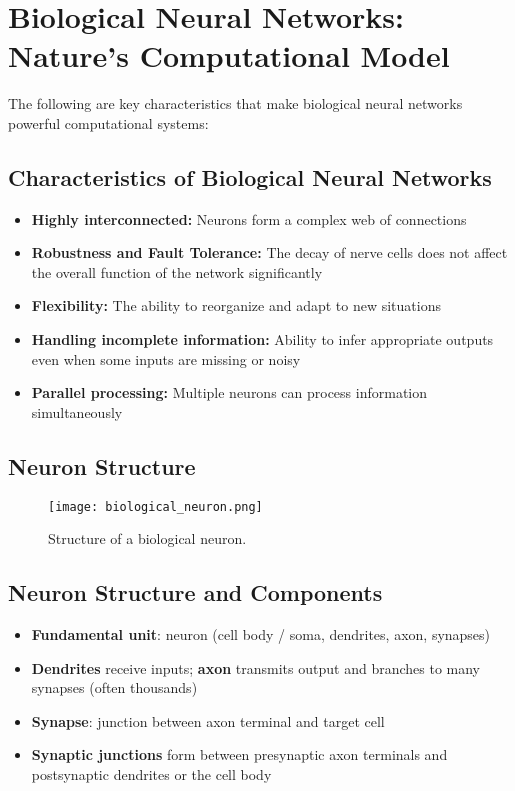 \section{Biological Neural Networks: Nature's Computational Model}
The following are key characteristics that make biological neural networks powerful computational systems:

\subsection{Characteristics of Biological Neural Networks}
\begin{itemize}
    \item \textbf{Highly interconnected:} Neurons form a complex web of connections
    \item \textbf{Robustness and Fault Tolerance:} The decay of nerve cells does not affect the overall function of the network significantly
    \item \textbf{Flexibility:} The ability to reorganize and adapt to new situations
    \item \textbf{Handling incomplete information:} Ability to infer appropriate outputs even when some inputs are missing or noisy
    \item \textbf{Parallel processing:} Multiple neurons can process information simultaneously
\end{itemize}
\subsection{Neuron Structure}
\begin{figure}[h!]
\centering
\texttt{[image: biological\_neuron.png]}
\caption{Structure of a biological neuron.}
\end{figure}
\subsection{Neuron Structure and Components}
\begin{itemize}
    \item \textbf{Fundamental unit}: neuron (cell body / soma, dendrites, axon, synapses)
    \item \textbf{Dendrites} receive inputs; \textbf{axon} transmits output and branches to many synapses (often thousands)
    \item \textbf{Synapse}: junction between axon terminal and target cell
    \item \textbf{Synaptic junctions} form between presynaptic axon terminals and postsynaptic dendrites or the cell body
\end{itemize}

